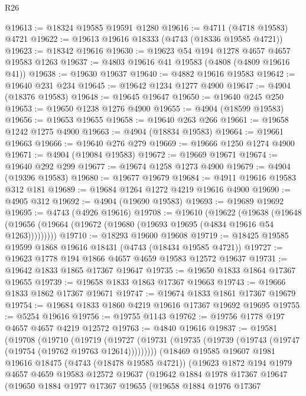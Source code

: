 \begin{lexlean}{R26}
\begin{coremodule}
@19613 := @18324 @19585 @19591 @1280
@19616 := @4711 (@4718 @19583) @4721
@19622 := @19613 @19616 @18333 (@4743 (@18336 @19585 @4721))
@19623 := @18342 @19616
@19630 := @19623 @54 @194 @1278 @4657 @4657 @19583 @1263
@19637 := @4803 @19616 @41 @19583 (@4808 (@4809 @19616 @41))
@19638 := @19630 @19637
@19640 := @4882 @19616 @19583
@19642 := @19640 @231 @234
@19645 := @19642 @1234 @1277 @4900
@19647 := @4904 (@18376 @19583)
@19648 := @19645 @19647
@19650 := @19640 @245 @250
@19653 := @19650 @1238 @1276 @4900
@19655 := @4904 (@18599 @19583)
@19656 := @19653 @19655
@19658 := @19640 @263 @266
@19661 := @19658 @1242 @1275 @4900
@19663 := @4904 (@18834 @19583)
@19664 := @19661 @19663
@19666 := @19640 @276 @279
@19669 := @19666 @1250 @1274 @4900
@19671 := @4904 (@19084 @19583)
@19672 := @19669 @19671
@19674 := @19640 @292 @299
@19677 := @19674 @1258 @1273 @4900
@19679 := @4904 (@19396 @19583)
@19680 := @19677 @19679
@19684 := @4911 @19616 @19583 @312 @181
@19689 := @19684 @1264 @1272 @4219 @19616 @4900
@19690 := @4905 @312
@19692 := @4904 (@19690 @19583)
@19693 := @19689 @19692
@19695 := @4743 (@4926 @19616)
@19708 := @19610
    (@19622
      (@19638
        (@19648 (@19656 (@19664 (@19672 (@19680 (@19693 @19695 (@4834 @19616 @54 @1263)))))))))
@19710 := @18293 @19600 @19608
@19719 := @18425 @19585 @19599 @1868 @19616 @18431 (@4743 (@18434 @19585 @4721))
@19727 := @19623 @1778 @194 @1866 @4657 @4659 @19583 @12572 @19637
@19731 := @19642 @1833 @1865 @17367 @19647
@19735 := @19650 @1833 @1864 @17367 @19655
@19739 := @19658 @1833 @1863 @17367 @19663
@19743 := @19666 @1833 @1862 @17367 @19671
@19747 := @19674 @1833 @1861 @17367 @19679
@19754 := @19684 @1833 @1860 @4219 @19616 @17367 @19692 @19695
@19755 := @5254 @19616
@19756 := @19755 @1143
@19762 := @19756 @1778 @197 @4657 @4657 @4219 @12572
@19763 := @4840 @19616
@19837 := @19581
    (@19708
      (@19710
        (@19719
          (@19727 (@19731 (@19735 (@19739 (@19743 (@19747 (@19754 (@19762 @19763 @12614)))))))))
        (@18469
          @19585
          @19607
          @1981
          @19616
          @18475
          (@4743 (@18478 @19585 @4721))
          (@19623
            @1872
            @194
            @1979
            @4657
            @4659
            @19583
            @12572
            @19637
            (@19642
              @1884
              @1978
              @17367
              @19647
              (@19650
                @1884
                @1977
                @17367
                @19655
                (@19658
                  @1884
                  @1976
                  @17367

\end{coremodule}
\end{lexlean}

